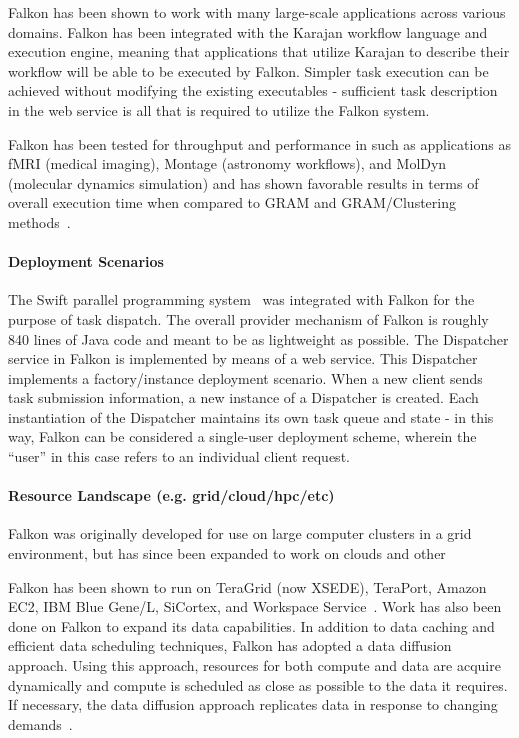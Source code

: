 \documentclass{sig-alternate}
\begin{document}
Falkon has been shown to work with many large-scale
applications across various domains. Falkon
has been integrated with the Karajan workflow language
and execution engine, meaning that applications
that utilize Karajan to describe their workflow
will be able to be executed by Falkon. Simpler
task execution can be achieved without
modifying the existing executables - sufficient
task description in the web service is all that
is required to utilize the Falkon system.

Falkon has been tested for throughput
and performance in such as applications
as fMRI (medical imaging), Montage (astronomy workflows),
and MolDyn (molecular dynamics simulation) and has shown
favorable results in terms of overall execution time when compared
to GRAM and GRAM/Clustering methods~\cite{1362680}.

\paragraph{Deployment Scenarios}

The Swift parallel programming system~\cite{Wilde2011} was integrated
with Falkon for the purpose of task dispatch. The overall provider
mechanism of Falkon is roughly 840 lines of Java code and meant
to be as lightweight as possible. The Dispatcher service
in Falkon is implemented by means of a web service.
This Dispatcher implements a factory/instance deployment scenario.
When a new client sends task submission information, a new instance
of a Dispatcher is created. Each instantiation of the Dispatcher maintains
its own task queue and state - in this way, Falkon can be considered
a single-user deployment scheme, wherein the ``user'' in this case
refers to an individual client request.

\paragraph{Resource Landscape (e.g. grid/cloud/hpc/etc)}
Falkon was originally developed for use on large computer clusters
in a grid environment, but has since been expanded to work on
clouds and other

Falkon has been shown to run on TeraGrid (now XSEDE), TeraPort, Amazon EC2, IBM
Blue Gene/L, SiCortex, and Workspace Service~\cite{1362680}.
 Work has also been done on Falkon
to expand its data capabilities. In addition to data caching and
efficient data scheduling techniques, Falkon has adopted a
data diffusion approach. Using this approach, resources for
both compute and data are acquire dynamically and compute
is scheduled as close as possible to the data it requires.
If necessary, the data diffusion approach replicates data
in response to changing demands~\cite{raicu2008accelerating}.
\end{document}
